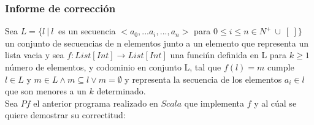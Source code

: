 \documentclass[12pt, a4paper]{article}
\begin{document}
\subsubsection{Informe de corrección}
Sea $L = \{ l~|~l~$ es un secuencia $<a_0,...a_i,...,a_n>$ para $0 \leq i \leq n \in  N^+ ~ \cup ~[\ ] \}$  un conjunto de secuencias de n elementos junto a un elemento que representa un lista vacia y sea $f: List[Int] \rightarrow List[Int]$ una funcińn definida en L para $k \geq 1$ número de elementos, y codominio en conjunto L, tal que $f(l) = m$ cumple $l \in L$ y $m \in L \land m \subseteq l \lor m = \emptyset$ y representa la secuencia de los elementos $a_i \in l$ que son menores a un $k$ determinado. \\
Sea $Pf$ el anterior programa realizado en $Scala$ que implementa $f$ y al cúal se quiere demostrar su correctitud:\\
\end{document}
